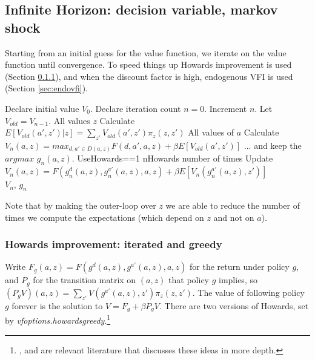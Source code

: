 \subsection{Infinite Horizon: decision variable, markov shock}
Starting from an initial guess for the value function, we iterate on the value function until convergence. To speed things up Howards improvement is used (Section \ref{sec:howards}), and when the discount factor is high, endogenous VFI is used (Section \ref{sec:endovfi}).
\begin{algorithmic}
 \State Declare initial value $V_0$.
 \State Declare iteration count $n=0$.
   \State Increment $n$. Let $V_{old}=V_{n-1}$.
   \For All values $z$
    \State Calculate $E[V_{old}(a',z')|z]=\sum_{z'} V_{old}(a',z') \pi_z(z,z')$
    \For All values of $a$
     \State Calculate $V_n(a,z)=max_{d,a' \in D(a,z)} F(d,a',a,z)+\beta E[V_{old}(a',z')]$
     \State ... and keep the $argmax$ $g_n(a,z)$.
     \EndFor
   \EndFor
   \If UseHowards==1
    \For nHowards number of times
     \State Update $V_n(a,z)=F(g^{d}_n(a,z),g^{a'}_n(a,z),a,z)+\beta E[V_n(g^{a'}_n(a,z),z')]$
    \EndFor
   \EndIf
 \EndWhile
 \\ \Return $V_n$, $g_n$
\end{algorithmic}
Note that by making the outer-loop over $z$ we are able to reduce the number of times we compute the expectations (which depend on $z$ and not on $a$).

\subsubsection{Howards improvement: iterated and greedy} \label{sec:howards}
Write $F_{g}(a,z)=F(g^{d}(a,z),g^{a'}(a,z),a,z)$ for the return under policy $g$, and $P_{g}$ for the transition matrix on $(a,z)$ that policy $g$ implies, so $(P_{g}V)(a,z)=\sum_{z'} V(g^{a'}(a,z),z')\pi_z(z,z')$. The value of following policy $g$ forever is the solution to $V=F_g+\beta P_g V$. There are two versions of Howards, set by \textit{vfoptions.howardsgreedy}.\footnote{\cite{Rendahl2022}, \cite{BakotaKredler2022} and \cite{PhelanEslami2022} are relevant literature that discusses these ideas in more depth.}

